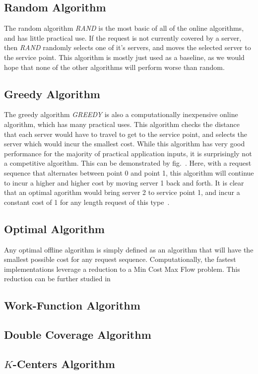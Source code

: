 
\subsection*{Random Algorithm}
\label{sec:rand}
The random algorithm \textit{RAND} is the most basic of all of the online algorithms, and has little practical use. If the request is not currently covered by a server, then \textit{RAND} randomly selects one of it's servers, and moves the selected server to the service point. This algorithm is mostly just used as a baseline, as we would hope that none of the other algorithms will perform worse than random.

\subsection*{Greedy Algorithm}
\label{sec:greedy}
The greedy algorithm \textit{GREEDY} is also a computationally inexpensive online algorithm, which has many practical uses. This algorithm checks the distance that each server would have to travel to get to the service point, and selects the server which would incur the smallest cost. While this algorithm has very good performance for the majority of practical application inputs, it is surprisingly not a competitive algorithm. This can be demonstrated by fig.~. Here, with a request sequence that alternates between point 0 and point 1, this algorithm will continue to incur a higher and higher cost by moving server 1 back and forth. It is clear that an optimal agorithm would bring server 2 to service point 1, and incur a constant cost of 1 for any length request of this type~\cite{OnlineComp1998}.

\subsection*{Optimal Algorithm}
\label{sec:OPT}
Any optimal offline algorithm is simply defined as an algorithm that will have the smallest possible cost for any request sequence. Computationally, the fastest implementations leverage a reduction to a Min Cost Max Flow problem. This reduction can be further studied in~\cite{WFA2009}


\subsection*{Work-Function Algorithm}
\label{sec:WFA}

\subsection*{Double Coverage Algorithm}
\label{sec:DC}

\subsection*{$K$-Centers Algorithm}
\label{sec:KC}